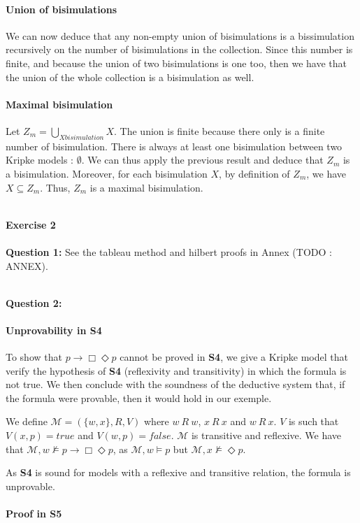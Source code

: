 \documentclass[10pt]{article}
\def\exercise#1{\ \vspace{1cm}\\\Large\textbf{Exercise #1}\normalsize\\}
\def\question#1{\ \vspace{1cm}\\\textbf{Question #1:}\quad}
\def\M{\mathcal{M}}
\begin{document}
\paragraph{Union of bisimulations} We can now deduce that any non-empty union of bisimulations is a bissimulation recursively on the number of bisimulations in the collection. Since this number is finite, and because the union of two bisimulations is one too, then we have that the union of the whole collection is a bisimulation as well.

\paragraph{Maximal bisimulation} Let $Z_m = \underset{X \mathit{bisimulation}}{\bigcup} X$. The union is finite because there only is a finite number of bisimulation. There is always at least one bisimulation between two Kripke models : $\emptyset$. We can thus apply the previous result and deduce that $Z_m$ is a bisimulation. Moreover, for each bisimulation $X$, by definition of $Z_m$, we have $X\subseteq Z_m$. Thus, $Z_m$ is a maximal bisimulation.



\exercise{2}
\question{1}
See the tableau method and hilbert proofs in Annex (TODO : ANNEX).



\question{2}
\paragraph{Unprovability in \textbf{S4}} To show that $p\rightarrow\Box\Diamond p$ cannot be proved in \textbf{S4}, we give a Kripke model that verify the hypothesis of \textbf{S4} (reflexivity and transitivity) in which the formula is not true. We then conclude with the soundness of the deductive system that, if the formula were provable, then it would hold in our exemple.

We define $\M=(\{w,x\},R,V)$ where $w\ R\ w$, $x\ R\ x$ and $w\ R\ x$. $V$ is such that $V(x,p)=\mathit{true}$ and $V(w,p)=\mathit{false}$. $\M$ is transitive and reflexive. We have that $\M,w\not\models p\rightarrow\Box\Diamond p$, as $\M,w\models p$ but $\M,x\not\models\Diamond p$.

As \textbf{S4} is sound for models with a reflexive and transitive relation, the formula is unprovable.

\paragraph{Proof in \textbf{S5}} 
\end{document}
